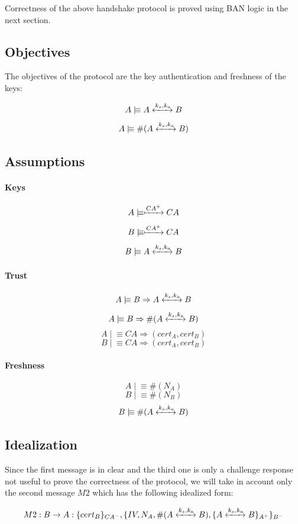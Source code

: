 \documentclass[a4paper,12pt]{article}
\newcommand{\believes}{\mid\!\equiv}
\newcommand{\controls}{\Rightarrow}
\newcommand{\fresh}[1]{\#(#1)}
\newcommand{\sharekey}[1]{\xleftrightarrow{#1}}
\newcommand{\pubkey}[1]{\xmapsto{#1}}
\begin{document}
Correctness of the above handshake protocol is proved using BAN logic in the next section.

\subsection{Objectives}

The objectives of the protocol are the key authentication and freshness of the keys:

\[A \believes A \sharekey{k_s, k_a} B \]
\[A \believes \fresh{A \sharekey{k_s, k_a} B} \]

\subsection{Assumptions}

\paragraph{Keys}

\[A \believes \pubkey{CA^+} CA \]
\[B \believes \pubkey{CA^+} CA \]
\[B \believes A \sharekey{k_s, k_a} B \]

\paragraph{Trust}

\[A \believes B \controls A \sharekey{k_s, k_a} B \]
\[A \believes B \controls \fresh{A \sharekey{k_s, k_a} B} \]
\[A \believes CA \controls (cert_A, cert_B) \]
\[B \believes CA \controls (cert_A, cert_B) \]

\paragraph{Freshness}

\[A \believes \fresh{N_A} \]
\[B \believes \fresh{N_B} \]
\[B \believes \fresh{A \sharekey{k_s, k_a} B} \]

\subsection{Idealization}

Since the first message is in clear and the third one is only a challenge response not useful to prove the correctness of the protocol, we will take in account only the second message $M2$ which has the following idealized form:

\[ M2: B \rightarrow A: \{cert_B\}_{CA^-}, \{IV, N_A, \fresh{A \sharekey{k_s, k_a} B}, \{A \sharekey{k_s, k_a} B\}_{A^+}\}_{B^-} \]
\end{document}

